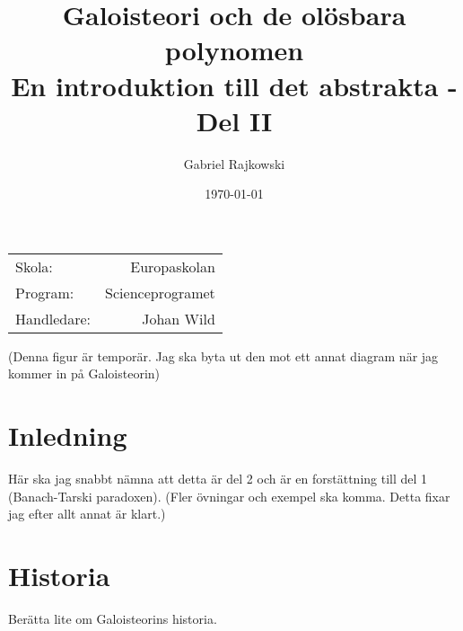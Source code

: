 \documentclass{article}
\theoremstyle{definition}
\begin{document}
\begin{figure}
  \begin{center}
    \newcommand{\mydistance}{.6cm}
  \end{center}  
\end{figure}
\title{%
  Galoisteori och de olösbara polynomen \\
  \small{En introduktion till det abstrakta - Del II}
}
\author{Gabriel Rajkowski}
\date{\today}
\maketitle
\begin{center}
  \begin{tabular}{l r}
  Skola: & Europaskolan \\ 
  Program: & Scienceprogramet \\ 
  Handledare: & Johan Wild
  \end{tabular}
\end{center}
(Denna figur är temporär. Jag ska byta ut den mot ett annat diagram när jag kommer in på Galoisteorin)

\thispagestyle{empty}
  
\clearpage
\tableofcontents
\section{Inledning}
Här ska jag snabbt nämna att detta är del 2 och är en forstättning till del 1 (Banach-Tarski paradoxen). 
(Fler övningar och exempel ska komma. Detta fixar jag efter allt annat är klart.)
\section{Historia}
Berätta lite om Galoisteorins historia. 
\end{document}
